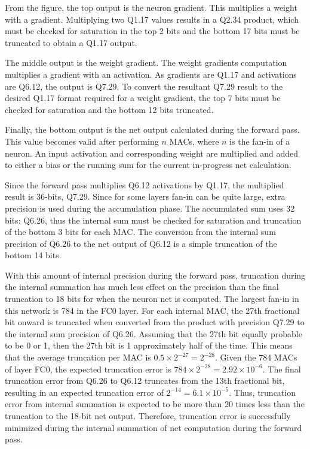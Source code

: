 From the figure, the top output is the neuron gradient. This multiplies a weight with a gradient. Multiplying two Q1.17 values results in a Q2.34 product, which must be checked for saturation in the top 2 bits and the bottom 17 bits must be truncated to obtain a Q1.17 output.

The middle output is the weight gradient. The weight gradients computation multiplies a gradient with an activation. As gradients are Q1.17 and activations are Q6.12, the output is Q7.29. To convert the resultant Q7.29 result to the desired Q1.17 format required for a weight gradient, the top 7 bits must be checked for saturation and the bottom 12 bits truncated. 

Finally, the bottom output is the net output calculated during the forward pass. This value becomes valid after performing $n$ MACs, where $n$ is the fan-in of a neuron. An input activation and corresponding weight are multiplied and added to either a bias or the running sum for the current in-progress net calculation. 

Since the forward pass multiplies Q6.12 activations by Q1.17, the multiplied result is 36-bits, Q7.29. Since for some layers fan-in can be quite large, extra precision is used during the accumulation phase. The accumulated sum uses 32 bits: Q6.26, thus the internal sum must be checked for saturation and truncation of the bottom 3 bits for each MAC. The conversion from the internal sum precision of Q6.26 to the net output of Q6.12 is a simple truncation of the bottom 14 bits.

With this amount of internal precision during the forward pass, truncation during the internal summation has much less effect on the precision than the final truncation to 18 bits for when the neuron net is computed. The largest fan-in in this network is 784 in the FC0 layer. For each internal MAC, the 27th fractional bit onward is truncated when converted from the product with precision Q7.29 to the internal sum precision of Q6.26. Assuming that the 27th bit equally probable to be 0 or 1, then the 27th bit is 1 approximately half of the time. This means that the average truncation per MAC is $0.5 \times 2^{-27} = 2^{-28}$. Given the 784 MACs of layer FC0, the expected truncation error is $784 \times 2^{-28} = 2.92\times{10^{-6}}$. The final truncation error from Q6.26 to Q6.12 truncates from the 13th fractional bit, resulting in an expected truncation error of $2^{-14} = 6.1\times10^{-5}$. Thus, truncation error from internal summation is expected to be more than 20 times less than the truncation to the 18-bit net output. Therefore, truncation error is successfully minimized during the internal summation of net computation during the forward pass.



